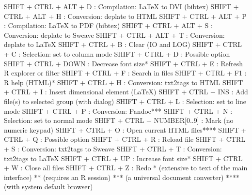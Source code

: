 \begin{Rtables}[caption={[SHIFT + keyboard shortcuts]
    SHIFT + keyboard shortcuts},
  label=shortcut:shiftplus]
  SHIFT + CTRL + ALT + D      : Compilation: LaTeX to DVI (bibtex)
  SHIFT + CTRL + ALT + H      : Conversion: deplate to HTML
  SHIFT + CTRL + ALT + P      : Compilation: LaTeX to PDF (bibtex)
  SHIFT + CTRL + ALT + S      : Conversion: deplate to Sweave
  SHIFT + CTRL + ALT + T      : Conversion: deplate to LaTeX
  SHIFT + CTRL + B            : Clear (IO and LOG)
  SHIFT + CTRL + C            : Selection: set to column mode
  SHIFT + CTRL + D            : Possible option
  SHIFT + CTRL + DOWN         : Decrease font size*
  SHIFT + CTRL + E            : Refresh R explorer or filter
  SHIFT + CTRL + F            : Search in files
  SHIFT + CTRL + F1           : R help (HTML)*
  SHIFT + CTRL + H            : Conversion: txt2tags to HTML
  SHIFT + CTRL + I            : Insert dimensional element (LaTeX)
  SHIFT + CTRL + INS          : Add file(s) to selected group (with dialog)
  SHIFT + CTRL + L            : Selection: set to line mode
  SHIFT + CTRL + P            : Conversion: Pandoc***
  SHIFT + CTRL + N            : Selection: set to normal mode
  SHIFT + CTRL + NUMBER[0..9] : Mark (no numeric keypad)
  SHIFT + CTRL + O            : Open current HTML files****
  SHIFT + CTRL + Q            : Possible option
  SHIFT + CTRL + R            : Reload file
  SHIFT + CTRL + S            : Conversion: txt2tags to Sweave
  SHIFT + CTRL + T            : Conversion: txt2tags to LaTeX
  SHIFT + CTRL + UP           : Increase font size*
  SHIFT + CTRL + W            : Close all files
  SHIFT + CTRL + Z            : Redo
  *    (extensive to text of the main interface)
  **   (requires an R session)
  ***  (a universal document converter)
  **** (with system default browser)
\end{Rtables}
